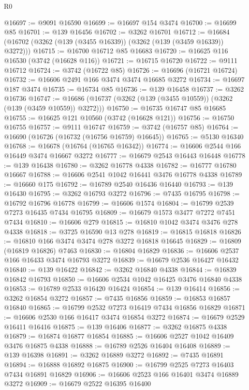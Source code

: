 \begin{lexlean}{R0}
\begin{coremodule}
@16697 := @9091 @16590
@16699 := @16697 @154 @3474
@16700 := @16699 @85
@16701 := @139 @16456
@16702 := @3262 @16701
@16712 := @16684 (@16702 (@3262 (@139 (@3455 @16339)) (@3262 (@139 (@3459 @16339)) @3272)))
@16715 := @16700 @16712 @85 @16683
@16720 := @16625 @116 @16530 (@3742 (@16628 @116))
@16721 := @16715 @16720
@16722 := @9111 @16712
@16724 := @3742 (@16722 @85)
@16726 := @16696 (@16721 @16724)
@16732 := @16606 @2491 @166 @3474 @3474 @16685 @3272
@16734 := @16697 @187 @3474
@16735 := @16734 @85
@16736 := @139 @16458
@16737 := @3262 @16736
@16747 := @16686 (@16737 (@3262 (@139 (@3455 @10559)) (@3262 (@139 (@3459 @10559)) @3272)))
@16750 := @16735 @16747 @85 @16685
@16755 := @16625 @121 @10560 (@3742 (@16628 @121))
@16756 := @16750 @16755
@16757 := @9111 @16747
@16759 := @3742 (@16757 @85)
@16764 := @16690 (@16726 (@16732 (@16756 @16759) @16645))
@16765 := @5130 @16340
@16768 := @16678 (@16764 (@16765 @16342))
@16774 := @16606 @2544 @166 @16449 @3474 @16667 @3272
@16777 := @16679 @2543 @16443 @16448
@16778 := @139 @16438
@16780 := @3262 @16778 @4338
@16782 := @16777 @16780 @16667
@16788 := @16606 @2541 @1042 @16441 @3476 @16778 @4338
@16789 := @16660 @175
@16792 := @16789 @2540 @16436 @16440
@16793 := @139 @16430
@16795 := @3262 @16793 @3272
@16796 := @7435 @16795
@16798 := @16792 @16796 @16778
@16799 := @16606 @1574
@16804 := @16799 @2539 @7273 @16435 @7434 @16795
@16809 := @16679 @1573 @3477 @7272 @7451 @7434
@16810 := @16606 @279
@16815 := @16810 @1042 @3474 @3476 @278 @4338
@16818 := @3725 @16590 @13 @278
@16819 := @16815 @16818
@16826 := @16810 @166 @3474 @3474 @278 @3272 @16818 @16645
@16829 := @16809 (@16819 @16826) @7463
@16830 := @16804 @16829
@16836 := @16606 @2537 @166 @16433 @3474 @16793 @3272
@16839 := @16679 @2536 @16427 @16432
@16840 := @139 @16422
@16842 := @3262 @16840 @4338
@16844 := @16839 @16842 @16793
@16850 := @16606 @2534 @1042 @16425 @3476 @16840 @4338
@16853 := @16789 @2533 @16420 @16424
@16854 := @139 @16414
@16856 := @3262 @16854 @3272
@16857 := @7435 @16856
@16859 := @16853 @16857 @16840
@16865 := @16799 @2532 @7273 @16419 @7434 @16856 @16829
@16871 := @16606 @2530 @166 @16417 @3474 @16854 @3272
@16874 := @16679 @2529 @16411 @16416
@16875 := @139 @16406
@16877 := @3262 @16875 @4338
@16879 := @16874 @16877 @16854
@16885 := @16606 @2527 @1042 @16409 @3476 @16875 @4338
@16888 := @16789 @2526 @16404 @16408
@16889 := @139 @16398
@16891 := @3262 @16889 @3272
@16892 := @7435 @16891
@16894 := @16888 @16892 @16875
@16900 := @16799 @2525 @7273 @16403 @7434 @16891 @16829
@16906 := @16606 @2523 @166 @16401 @3474 @16889 @3272
@16909 := @16679 @2522 @16395 @16400

\end{coremodule}
\end{lexlean}
